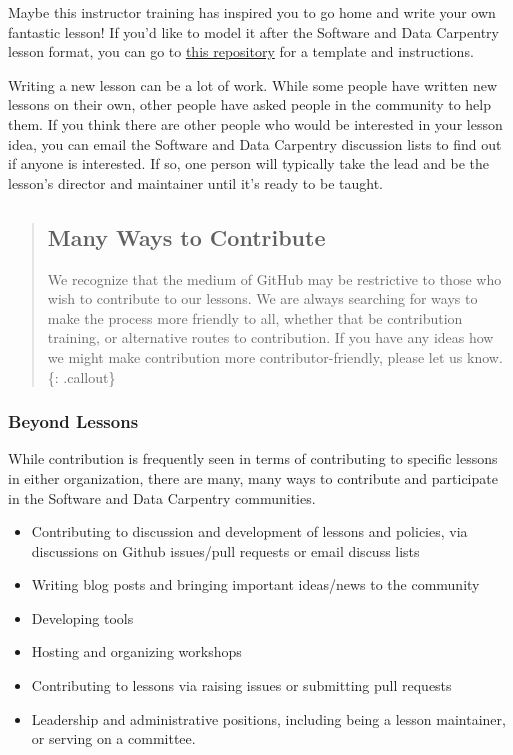 Maybe this instructor training has inspired you to go home and write
your own fantastic lesson! If you'd like to model it after the Software
and Data Carpentry lesson format, you can go to
\href{fixme}{this repository} for a template
and instructions.

Writing a new lesson can be a lot of work. While some people have
written new lessons on their own, other people have asked people in the
community to help them. If you think there are other people who would be
interested in your lesson idea, you can email the Software and Data
Carpentry discussion lists to find out if anyone is interested. If so,
one person will typically take the lead and be the lesson's director and
maintainer until it's ready to be taught.

\begin{quote}
\subsection{Many Ways to Contribute}\label{many-ways-to-contribute}

We recognize that the medium of GitHub may be restrictive to those who
wish to contribute to our lessons. We are always searching for ways to
make the process more friendly to all, whether that be contribution
training, or alternative routes to contribution. If you have any ideas
how we might make contribution more contributor-friendly, please let us
know. \{: .callout\}
\end{quote}

\subsubsection{Beyond Lessons}\label{beyond-lessons}

While contribution is frequently seen in terms of contributing to
specific lessons in either organization, there are many, many ways to
contribute and participate in the Software and Data Carpentry
communities.

\begin{itemize}
\item
  Contributing to discussion and development of lessons and policies,
  via discussions on Github issues/pull requests or email discuss lists
\item
  Writing blog posts and bringing important ideas/news to the community
\item
  Developing tools
\item
  Hosting and organizing workshops
\item
  Contributing to lessons via raising issues or submitting pull requests
\item
  Leadership and administrative positions, including being a lesson
  maintainer, or serving on a committee.
\end{itemize}

